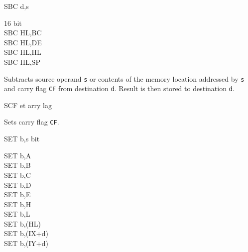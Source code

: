 \begin{basedescript}{
	\desclabelstyle{\multilinelabel}
	\desclabelwidth{3cm}}
\begin{DetailItem}{SBC d,s}
\begin{DetailVariants}
			\columnbreak
			\textnormal{16 bit}\\
			SBC HL,BC\\
			SBC HL,DE\\
			SBC HL,HL\\
			SBC HL,SP
		\end{DetailVariants}
		
		Subtracts source operand {\tt s} or contents of the memory location addressed by {\tt s} and carry flag {\tt CF} from destination {\tt d}. Result is then stored to destination {\tt d}.

		\begin{DetailEffects}[v]
			\FlagsSBCr[8-bit]
			\FlagsSBCrr[16-bit]
		\end{DetailEffects}
						
		\begin{DetailTiming}
		\end{DetailTiming}

	\end{DetailItem}

	\begin{DetailItem}{SCF}
		{et arry \IH{F}lag}
		{\SymSCF}

		Sets carry flag {\tt CF}.

		\begin{DetailEffects}
			\FlagsSCF
		\end{DetailEffects}
						
		\begin{DetailTiming}
			\DetailTime{1}{4}
		\end{DetailTiming}

	\end{DetailItem}

	\pagebreak
	\begin{DetailItem}{SET b,s}
		{ bit}
		{\SymSET{s}}

		\begin{DetailVariants}
			SET b,A\\
			SET b,B\\
			SET b,C\\
			SET b,D\\
			SET b,E\\
			SET b,H\\
			SET b,L\\
			SET b,(HL)\\
			SET b,(IX+d)\\
			SET b,(IY+d)


\end{DetailVariants}
\end{DetailItem}
\end{basedescript}
